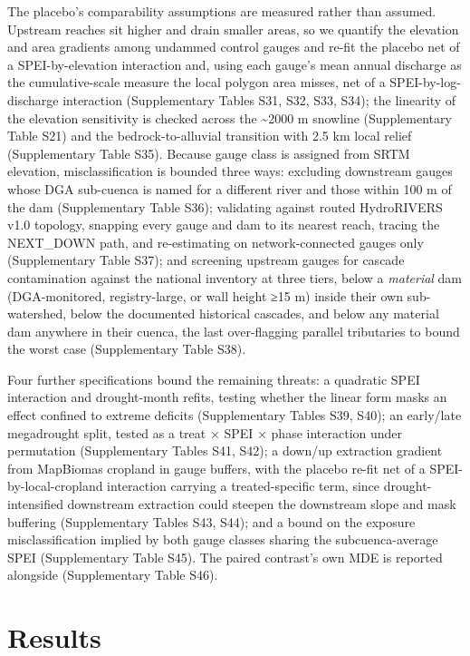 \documentclass[
]{agujournal2019}
\begin{document}
The placebo's comparability assumptions are measured rather than
assumed. Upstream reaches sit higher and drain smaller areas, so we
quantify the elevation and area gradients among undammed control gauges
and re-fit the placebo net of a SPEI-by-elevation interaction and, using
each gauge's mean annual discharge as the cumulative-scale measure the
local polygon area misses, net of a SPEI-by-log-discharge interaction
(Supplementary Tables S31, S32, S33, S34); the linearity of the
elevation sensitivity is checked across the \textasciitilde2000 m
snowline (Supplementary Table S21) and the bedrock-to-alluvial
transition with 2.5 km local relief (Supplementary Table S35). Because
gauge class is assigned from SRTM elevation, misclassification is
bounded three ways: excluding downstream gauges whose DGA sub-cuenca is
named for a different river and those within 100 m of the dam
(Supplementary Table S36); validating against routed HydroRIVERS v1.0
topology, snapping every gauge and dam to its nearest reach, tracing the
NEXT\_DOWN path, and re-estimating on network-connected gauges only
(Supplementary Table S37); and screening upstream gauges for cascade
contamination against the national inventory at three tiers, below a
\emph{material} dam (DGA-monitored, registry-large, or wall height ≥15
m) inside their own sub-watershed, below the documented historical
cascades, and below any material dam anywhere in their cuenca, the last
over-flagging parallel tributaries to bound the worst case
(Supplementary Table S38).

Four further specifications bound the remaining threats: a quadratic
SPEI interaction and drought-month refits, testing whether the linear
form masks an effect confined to extreme deficits (Supplementary Tables
S39, S40); an early/late megadrought split, tested as a treat × SPEI ×
phase interaction under permutation (Supplementary Tables S41, S42); a
down/up extraction gradient from MapBiomas cropland in gauge buffers,
with the placebo re-fit net of a SPEI-by-local-cropland interaction
carrying a treated-specific term, since drought-intensified downstream
extraction could steepen the downstream slope and mask buffering
(Supplementary Tables S43, S44); and a bound on the exposure
misclassification implied by both gauge classes sharing the
subcuenca-average SPEI (Supplementary Table S45). The paired contrast's
own MDE is reported alongside (Supplementary Table S46).

\section{Results}\label{results}
\end{document}
